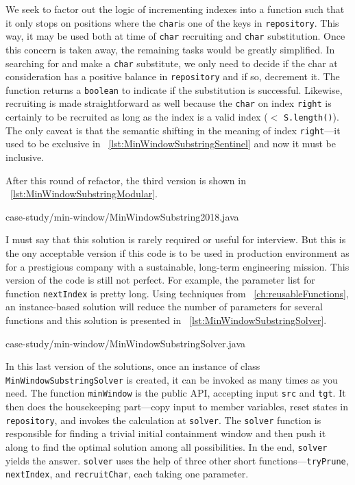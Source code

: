 \documentclass[oneside,11pt]{book}
\theoremstyle{definition}
\theoremstyle{remark}
\newcommand{\code}[1]{\mbox{\lstinline{#1}}}
\begin{document}
We seek to factor out the
logic of incrementing indexes into a function such that it only stops on positions where the
\code{char}is one of the keys in \code{repository}.
This way, it may be used both at time of \code{char} recruiting and \code{char} substitution.
Once this concern is taken away, the remaining tasks would be greatly simplified.
In searching for and make a \code{char} substitute, we only need to decide if the char at
consideration has a positive balance in \code{repository} and if so, decrement it.
The function returns a \code{boolean} to indicate if the substitution is successful.
Likewise, recruiting is made straightforward as well because the \code{char} on index
\code{right} is certainly to be recruited as long as the index is a valid index ($<$ \code{S.length()}).
The only caveat is that the semantic shifting in the meaning of index \code{right}---it used to
be exclusive in ~\autoref{lst:MinWindowSubstringSentinel} and now it must be inclusive.

After this round of refactor, the third version is shown in
~\autoref{lst:MinWindowSubstringModular}.


{case-study/min-window/MinWindowSubstring2018.java}

I must say that this solution is rarely required or useful for interview.
But this is the ony acceptable version if this code is to be used in production
environment as for a prestigious company with a sustainable, long-term engineering mission.
This version of the code is still not perfect.
For example, the parameter list for function \code{nextIndex} is pretty long.
Using techniques from ~\autoref{ch:reusableFunctions},
an instance-based solution will reduce the number of parameters for several functions and this
solution is presented in ~\autoref{lst:MinWindowSubstringSolver}.


{case-study/min-window/MinWindowSubstringSolver.java}

In this last version of the solutions, once an instance of class \code{MinWindowSubstringSolver}
is created, it can be invoked as many times as you need.
The function \code{minWindow} is the public API, accepting input \code{src} and \code{tgt}.
It then does the housekeeping part---copy input to member variables, reset states in
\code{repository}, and invokes the calculation at \code{solver}.
The \code{solver} function is responsible for finding a trivial initial containment window and
then push it along to find the optimal solution among all possibilities.
In the end, \code{solver} yields the answer.
\code{solver} uses the help of three other short functions---\code{tryPrune}, \code{nextIndex}, and
\code{recruitChar}, each taking one parameter.
\end{document}
